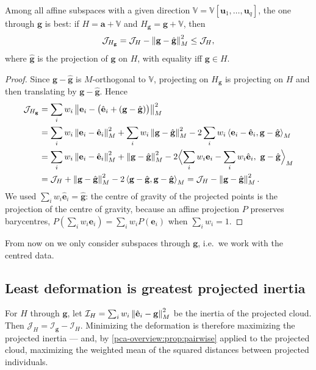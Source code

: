 \begin{notechapter}
\begin{proposition}\label{pca-overview:prop:through-g}
Among all affine subspaces with a given direction $\mathbb V = \mathbb V[\mathbf u_1,\dots,\mathbf u_q]$, the one
through $\mathbf g$ is best: if $H = \mathbf a + \mathbb V$ and $H_{\mathbf g} = \mathbf g + \mathbb V$, then
\[
  \mathcal J_{H_{\mathbf g}} = \mathcal J_H - \left\|\mathbf g - \hat{\mathbf g}\right\|_M^2\leq\mathcal J_H,
\]
where $\hat{\mathbf g}$ is the projection of $\mathbf g$ on $H$, with equality iff $\mathbf g\in H$.
\end{proposition}

\begin{proof}
Since $\mathbf g - \hat{\mathbf g}$ is $M$-orthogonal to $\mathbb V$, projecting on $H_{\mathbf g}$ is projecting on $H$
and then translating by $\mathbf g - \hat{\mathbf g}$. Hence
\begin{align*}
  \mathcal J_{H_{\mathbf g}}
  &= \sum_iw_i\norm{\mathbf e_i - \bigl(\hat{\mathbf e}_i + (\mathbf g - \hat{\mathbf g})\bigr)}_M^2\\
  &= \sum_iw_i\norm{\mathbf e_i - \hat{\mathbf e}_i}_M^2 + \sum_iw_i\norm{\mathbf g - \hat{\mathbf g}}_M^2
     - 2\sum_iw_i\inner{\mathbf e_i - \hat{\mathbf e}_i}{\mathbf g - \hat{\mathbf g}}_M\\
  &= \sum_iw_i\norm{\mathbf e_i - \hat{\mathbf e}_i}_M^2 + \norm{\mathbf g - \hat{\mathbf g}}_M^2
     - 2\Bigl\langle\sum_iw_i\mathbf e_i - \sum_iw_i\hat{\mathbf e}_i,\ \mathbf g - \hat{\mathbf g}\Bigr\rangle_M\\
  &= \mathcal J_H + \norm{\mathbf g - \hat{\mathbf g}}_M^2 - 2\inner{\mathbf g - \hat{\mathbf g}}{\mathbf g - \hat{\mathbf g}}_M
   = \mathcal J_H - \norm{\mathbf g - \hat{\mathbf g}}_M^2 .
\end{align*}
We used $\sum_iw_i\hat{\mathbf e}_i = \hat{\mathbf g}$: the centre of gravity of the projected points is the
projection of the centre of gravity, because an affine projection $P$ preserves barycentres,
$P(\sum_iw_i\mathbf e_i) = \sum_iw_iP(\mathbf e_i)$ when $\sum_iw_i = 1$.
\end{proof}

From now on we only consider subspaces through $\mathbf g$, i.e.\ we work with the centred data.

\subsection{Least deformation is greatest projected inertia}

\begin{proposition}\label{pca-overview:prop:max-inertia}
For $H$ through $\mathbf g$, let $\mathcal I_H = \sum_iw_i\left\|\hat{\mathbf e}_i - \mathbf g\right\|_M^2$ be the inertia of the
projected cloud. Then $\mathcal J_H = \mathcal I_{\mathbf g} - \mathcal I_H$. Minimizing the deformation is therefore
maximizing the projected inertia --- and, by \cref{pca-overview:prop:pairwise} applied to the
projected cloud, maximizing the weighted mean of the squared distances between projected
individuals.
\end{proposition}


\end{notechapter}
